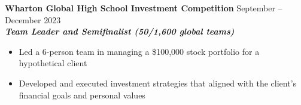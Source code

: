 \noindent
\textbf{Wharton Global High School Investment Competition} \hfill September -- December 2023 \\
\textbf{\textit{Team Leader and Semifinalist (50/1,600 global teams)}}
\begin{itemize}
	\item Led a 6-person team in managing a \$100,000 stock portfolio for a hypothetical client
	\item Developed and executed investment strategies that aligned with the client's financial goals and personal values
\end{itemize}
